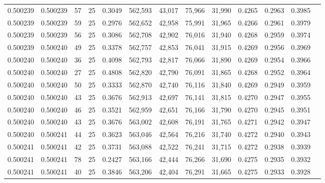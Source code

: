 \begin{tabular}{rrrrrrrrrrrrr}
0.500239 & 0.500239 &    57 &  25 &                                     0.3049 & 562,593 &  43,017 &  75,966 &  31,990 & 0.4265 & 0.2963 & 0.3985 \\
0.500239 & 0.500239 &    59 &  25 &                                     0.2976 & 562,652 &  42,958 &  75,991 &  31,965 & 0.4266 & 0.2961 & 0.3979 \\
0.500239 & 0.500239 &    56 &  25 &                                     0.3086 & 562,708 &  42,902 &  76,016 &  31,940 & 0.4268 & 0.2959 & 0.3974 \\
0.500239 & 0.500240 &    49 &  25 &                                     0.3378 & 562,757 &  42,853 &  76,041 &  31,915 & 0.4269 & 0.2956 & 0.3969 \\
0.500240 & 0.500240 &    36 &  25 &                                     0.4098 & 562,793 &  42,817 &  76,066 &  31,890 & 0.4269 & 0.2954 & 0.3966 \\
0.500240 & 0.500240 &    27 &  25 &                                     0.4808 & 562,820 &  42,790 &  76,091 &  31,865 & 0.4268 & 0.2952 & 0.3964 \\
0.500240 & 0.500240 &    50 &  25 &                                     0.3333 & 562,870 &  42,740 &  76,116 &  31,840 & 0.4269 & 0.2949 & 0.3959 \\
0.500240 & 0.500240 &    43 &  25 &                                     0.3676 & 562,913 &  42,697 &  76,141 &  31,815 & 0.4270 & 0.2947 & 0.3955 \\
0.500240 & 0.500240 &    46 &  25 &                                     0.3521 & 562,959 &  42,651 &  76,166 &  31,790 & 0.4270 & 0.2945 & 0.3951 \\
0.500240 & 0.500240 &    43 &  25 &                                     0.3676 & 563,002 &  42,608 &  76,191 &  31,765 & 0.4271 & 0.2942 & 0.3947 \\
0.500240 & 0.500241 &    44 &  25 &                                     0.3623 & 563,046 &  42,564 &  76,216 &  31,740 & 0.4272 & 0.2940 & 0.3943 \\
0.500241 & 0.500241 &    42 &  25 &                                     0.3731 & 563,088 &  42,522 &  76,241 &  31,715 & 0.4272 & 0.2938 & 0.3939 \\
0.500241 & 0.500241 &    78 &  25 &                                     0.2427 & 563,166 &  42,444 &  76,266 &  31,690 & 0.4275 & 0.2935 & 0.3932 \\
0.500241 & 0.500241 &    40 &  25 &                                     0.3846 & 563,206 &  42,404 &  76,291 &  31,665 & 0.4275 & 0.2933 & 0.3928 \\

\end{tabular}
